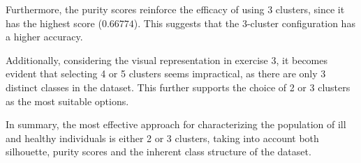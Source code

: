 \documentclass[12pt]{article}
\begin{document}
\begin{enumerate}[leftmargin=\labelsep]
        Furthermore, the purity scores reinforce the efficacy of using 3 clusters, since it has the highest score ($0.66774$).
        This suggests that the 3-cluster configuration has a higher accuracy.

        Additionally, considering the visual representation in exercise 3, it becomes evident that selecting 4 or 5 clusters seems impractical,
        as there are only 3 distinct classes in the dataset. This further supports the choice of 2 or 3 clusters as the most suitable options.

        In summary, the most effective approach for characterizing the population of ill and healthy individuals is either 2 or 3 clusters, taking into
        account both silhouette, purity scores and the inherent class structure of the dataset.
\end{enumerate}
\end{document}
